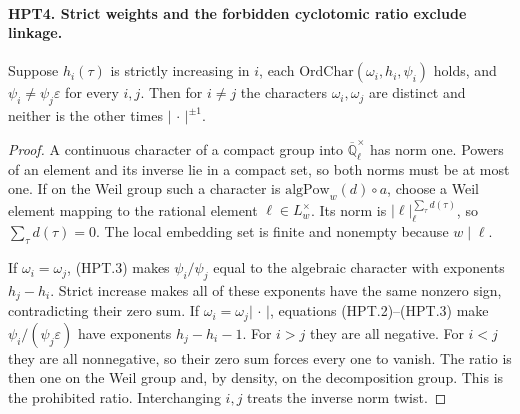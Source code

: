 \paragraph{HPT4. Strict weights and the forbidden cyclotomic ratio exclude linkage.}
\label{claim:HPT4}
Suppose $h_i(\tau)$ is strictly increasing in $i$, each
$\mathrm{OrdChar}(\omega_i,h_i,\psi_i)$ holds, and
$\psi_i\ne\psi_j\varepsilon$ for every $i,j$.
Then for $i\ne j$ the characters $\omega_i,\omega_j$ are distinct
and neither is the other times $|\,\cdot\,|^{\pm1}$.
\begin{proof}
A continuous character of a compact group into
$\overline{\mathbb Q}_\ell^\times$ has norm one.  Powers of an
element and its inverse lie in a compact set, so both norms must
be at most one.  If on the Weil group such a character is
$\mathrm{algPow}_w(d)\circ a$, choose a Weil element mapping to
the rational element $\ell\in L_w^\times$.  Its norm is
$|\ell|_\ell^{\sum_\tau d(\tau)}$, so
$\sum_\tau d(\tau)=0$.  The local embedding set is finite and
nonempty because $w\mid\ell$.

If $\omega_i=\omega_j$, (HPT.3) makes $\psi_i/\psi_j$ equal to
the algebraic character with exponents $h_j-h_i$.  Strict increase
makes all of these exponents have the same nonzero sign, contradicting
their zero sum.  If $\omega_i=\omega_j|\,\cdot\,|$, equations
(HPT.2)--(HPT.3) make $\psi_i/(\psi_j\varepsilon)$ have exponents
$h_j-h_i-1$.  For $i>j$ they are all negative.  For $i<j$ they are
all nonnegative, so their zero sum forces every one to vanish.
The ratio is then one on the Weil group and, by density, on the
decomposition group.  This is the prohibited ratio.  Interchanging
$i,j$ treats the inverse norm twist.
\end{proof}

